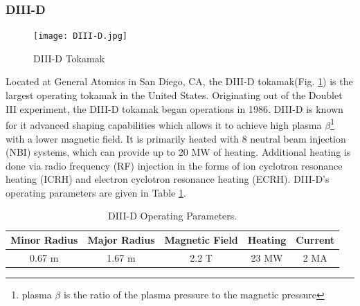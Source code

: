 \subsubsection{DIII-D}
\begin{figure}[ht]
    \centering
    \texttt{[image: DIII-D.jpg]}
    \caption{DIII-D Tokamak}
    \label{fig:d3d}
\end{figure}
Located at General Atomics in San Diego, CA, the DIII-D tokamak(Fig. \ref{fig:d3d}) is the largest operating tokamak in the United States\cite{luxon2002design}.
Originating out of the Doublet III experiment, the DIII-D tokamak began operations in 1986. DIII-D is known for it advanced shaping capabilities which allows it to achieve high plasma $\beta$\footnote{plasma $\beta$ is the ratio of the plasma pressure to the magnetic pressure} with a lower magnetic field. It is primarily heated with 8 neutral beam injection (NBI) systems, which can provide up to 20 MW of heating. Additional heating is done via radio frequency (RF) injection in the forms of ion cyclotron resonance heating (ICRH) and electron cyclotron resonance heating (ECRH). DIII-D's operating parameters are given in Table \ref{tab:d3d}.
\begin{table}[h!]
    \centering
    \caption{DIII-D Operating Parameters\cite{luxon2002design}.}
    \label{tab:d3d}
    \begin{tabular}{ccccc}
        \textbf{Minor Radius} & \textbf{Major Radius} & \textbf{Magnetic Field} & \textbf{Heating} & \textbf{Current} \\ \hline \hline
        0.67 m & 1.67 m & 2.2 T & 23 MW & 2 MA \\ \hline
    \end{tabular}
\end{table}

